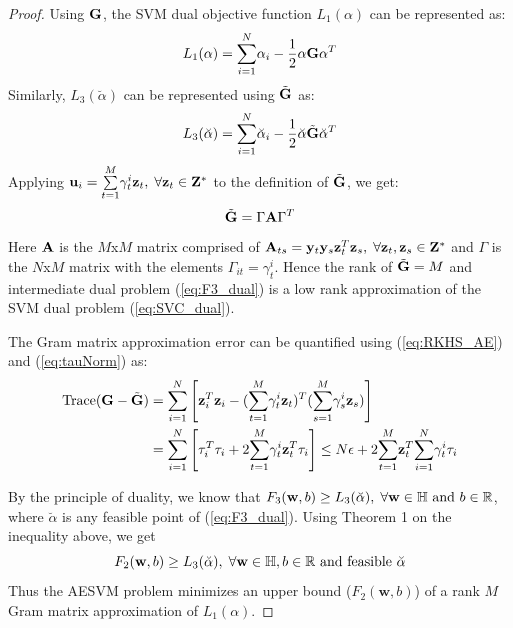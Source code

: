 \documentclass[twoside]{article}
\begin{document}
\begin{proof}
Using $\bf G$, the SVM dual objective function $L_1(\alpha)$ can be represented as:
\begin{equation*}
L_1(\alpha) = \overset{N}{\underset{i = 1}{\sum}}\alpha_{i} - \frac{1}{2}\alpha {\bf G} \alpha ^T
\end{equation*}
Similarly, $L_3(\breve{\alpha})$ can be represented using $\tilde{\bf G}$ as:
\begin{equation*}
L_3(\breve{\alpha}) = \overset{N}{\underset{i = 1}{\sum}}\breve{\alpha}_{i} - \frac{1}{2}\breve{\alpha} \tilde{\bf G} \breve{\alpha}^T
\end{equation*}
Applying ${\bf u}_i = \overset{M}{\underset{t = 1}\sum} \gamma^i _t {\bf z}_t, \;\forall {\bf z}_t \in {\bf Z}^*$ to the definition of $\tilde{\bf G}$, we get:
\begin{equation*}
\tilde{\bf G} = \Gamma {\bf A} \Gamma ^T
\end{equation*}
Here ${\bf A}$ is the $M$x$M$ matrix comprised of ${\bf A}_{ts} = {\bf y}_t {\bf y}_s {\bf z}_t ^T {\bf z}_s, \; \forall {\bf z}_t, {\bf z}_s \in {\bf Z}^*$ and $\Gamma$ is the $N$x$M$ matrix with the elements $\Gamma_{it} = \gamma_t ^i$. Hence the rank of $\tilde{\bf G} = M$ and intermediate dual problem (\ref{eq:F3_dual}) is a low rank approximation of the SVM dual problem (\ref{eq:SVC_dual}).

The Gram matrix approximation error can be quantified using (\ref{eq:RKHS_AE}) and (\ref{eq:tauNorm}) as:
\begin{align*}
\mathrm{Trace}({\bf G} - \tilde{\bf G}) &= \overset{N}{\underset{i = 1}{\sum}} \left[{\bf z}_i ^T {\bf z}_i - (\overset{M}{\underset{t = 1}\sum} \gamma^i _t {\bf z}_t) ^T (\overset{M}{\underset{s = 1}\sum} \gamma^i _s{\bf z}_s)\right]\\
& = \overset{N}{\underset{i = 1}{\sum}} \left[\tau_i ^T \tau_i + 2\overset{M}{\underset{t = 1}\sum} \gamma^i _t {\bf z}_t ^T \tau_i\right] \le N\epsilon + 2 \overset{M}{\underset{t = 1}\sum} {\bf z}_t ^T \overset{N}{\underset{i = 1}{\sum}} \gamma^i _t \tau_i
\end{align*}

By the principle of duality, we know that ${F}_3(\mathbf{w} ,b) \ge L_3(\breve{\alpha}), \; \forall {\bf w} \in \mathbb{H} \text{ and } b \in \mathbb{R}$, where $\breve{\alpha}$ is any feasible point of (\ref{eq:F3_dual}). Using Theorem 1 on the inequality above, we get
\begin{equation*}
{F}_2(\mathbf{w} ,b) \ge L_3(\breve{\alpha}), \; \forall {\bf w} \in \mathbb{H}, b \in \mathbb{R} \text{ and feasible $\breve{\alpha}$}
\end{equation*}
Thus the AESVM problem minimizes an upper bound (${F}_2(\mathbf{w} ,b)$) of a rank $M$ Gram matrix approximation of $L_1(\alpha)$.
\end{proof}
\end{document}
